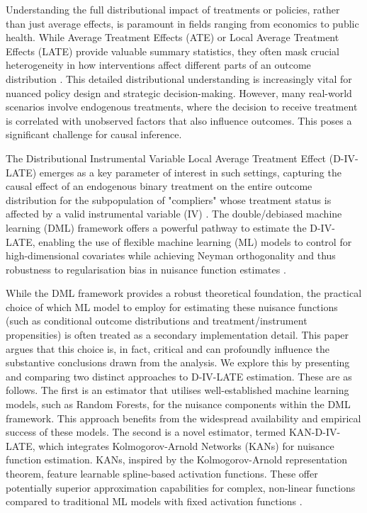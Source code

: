 \documentclass[final,3p,fleqn, 10pt]{elsarticle}
\begin{document}
Understanding the full distributional impact of treatments or policies, rather than just average effects, is paramount in fields ranging from economics to public health. While Average Treatment Effects (ATE) or Local Average Treatment Effects (LATE) provide valuable summary statistics, they often mask crucial heterogeneity in how interventions affect different parts of an outcome distribution \citep{angrist1996identification, imbens1994}. This detailed distributional understanding is increasingly vital for nuanced policy design and strategic decision-making. However, many real-world scenarios involve endogenous treatments, where the decision to receive treatment is correlated with unobserved factors that also influence outcomes. This poses a significant challenge for causal inference.

The Distributional Instrumental Variable Local Average Treatment Effect (D-IV-LATE) emerges as a key parameter of interest in such settings, capturing the causal effect of an endogenous binary treatment on the entire outcome distribution for the subpopulation of "compliers" whose treatment status is affected by a valid instrumental variable (IV) \citep{imbens1997estimating, abadie2002bootstrap}. The double/debiased machine learning (DML) framework offers a powerful pathway to estimate the D-IV-LATE, enabling the use of flexible machine learning (ML) models to control for high-dimensional covariates while achieving Neyman orthogonality and thus robustness to regularisation bias in nuisance function estimates \citep{chernozhukov2018debiased}.

While the DML framework provides a robust theoretical foundation, the practical choice of which ML model to employ for estimating these nuisance functions (such as conditional outcome distributions and treatment/instrument propensities) is often treated as a secondary implementation detail. This paper argues that this choice is, in fact, critical and can profoundly influence the substantive conclusions drawn from the analysis. We explore this by presenting and comparing two distinct approaches to D-IV-LATE estimation. These are as follows.
The first is an estimator that utilises well-established machine learning models, such as Random Forests, for the nuisance components within the DML framework. This approach benefits from the widespread availability and empirical success of these models. The second is a novel estimator, termed KAN-D-IV-LATE, which integrates Kolmogorov-Arnold Networks (KANs) for nuisance function estimation. KANs, inspired by the Kolmogorov-Arnold representation theorem, feature learnable spline-based activation functions. These offer potentially superior approximation capabilities for complex, non-linear functions compared to traditional ML models with fixed activation functions \citep{liu2024kan, kratsios2025kolmogorov}.
\end{document}
